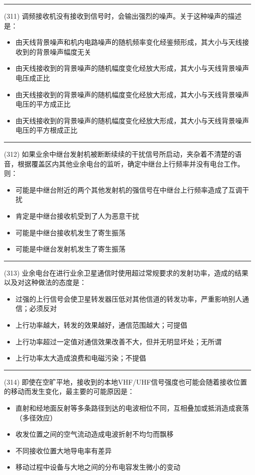 \documentclass[twocolumn]{ctexart}  %
\begin{document}
\noindent\rule{0.5\textwidth}{1pt}
\heiti (311) 调频接收机没有接收到信号时，会输出强烈的噪声。关于这种噪声的描述是： \songti {\color{gray} [LK0790] }
\begin{itemize}
	\item  由天线背景噪声和机内电路噪声的随机频率变化经鉴频形成，其大小与天线接收到的背景噪声幅度无关
	\item  由天线接收到的背景噪声的随机幅度变化经放大形成，其大小与天线背景噪声电压成正比
	\item  由天线接收到的背景噪声的随机幅度变化经放大形成，其大小与天线背景噪声电压的平方成正比
	\item  由天线接收到的背景噪声的随机幅度变化经放大形成，其大小与天线背景噪声电压的平方根成正比
\end{itemize}


\noindent\rule{0.5\textwidth}{1pt}
\heiti (312) 如果业余中继台发射机被断断续续的干扰信号所启动，夹杂着不清楚的语音，根据覆盖区内其他业余电台的监听，确定中继台上行频率并没有电台工作。则： \songti {\color{gray} [LK0855] }
\begin{itemize}
	\item  可能是中继台附近的两个其他发射机的强信号在中继台上行频率造成了互调干扰
	\item  肯定是中继台接收机受到了人为恶意干扰
	\item  可能是中继台接收机发生了寄生振荡
	\item  可能是中继台发射机发生了寄生振荡
\end{itemize}


\noindent\rule{0.5\textwidth}{1pt}
\heiti (313) 业余电台在进行业余卫星通信时使用超过常规要求的发射功率，造成的结果以及对这种做法的态度是： \songti {\color{gray} [LK0898] }
\begin{itemize}
	\item  过强的上行信号会使卫星转发器压低对其他信道的转发功率，严重影响别人通信；必须反对
	\item  上行功率越大，转发的效果越好，通信范围越大；可提倡
	\item  上行功率超过一定值对通信效果改善不大，但并无明显坏处；无所谓
	\item  上行功率太大造成浪费和电磁污染；不提倡
\end{itemize}


\noindent\rule{0.5\textwidth}{1pt}
\heiti (314) 即使在空旷平地，接收到的本地VHF/UHF信号强度也可能会随着接收位置的移动而发生变化，最主要的可能原因是： \songti {\color{gray} [LK0971] }
\begin{itemize}
	\item  直射和经地面反射等多条路径到达的电波相位不同，互相叠加或抵消造成衰落（多径效应）
	\item  收发位置之间的空气流动造成电波折射不均匀而飘移
	\item  不同接收位置大地导电率有差异
	\item  移动过程中设备与大地之间的分布电容发生微小的变动
\end{itemize}
\end{document}
